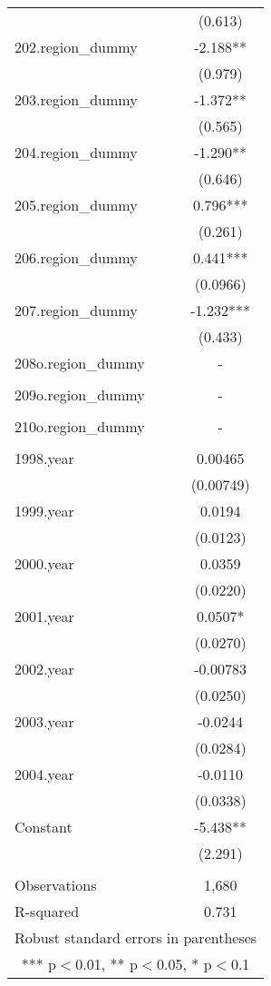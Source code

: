 \documentclass[]{article}
\begin{document}
\begin{tabular}{lc}
 & (0.613) \\
202.region\_dummy & -2.188** \\
 & (0.979) \\
203.region\_dummy & -1.372** \\
 & (0.565) \\
204.region\_dummy & -1.290** \\
 & (0.646) \\
205.region\_dummy & 0.796*** \\
 & (0.261) \\
206.region\_dummy & 0.441*** \\
 & (0.0966) \\
207.region\_dummy & -1.232*** \\
 & (0.433) \\
208o.region\_dummy & - \\
 &  \\
209o.region\_dummy & - \\
 &  \\
210o.region\_dummy & - \\
 &  \\
1998.year & 0.00465 \\
 & (0.00749) \\
1999.year & 0.0194 \\
 & (0.0123) \\
2000.year & 0.0359 \\
 & (0.0220) \\
2001.year & 0.0507* \\
 & (0.0270) \\
2002.year & -0.00783 \\
 & (0.0250) \\
2003.year & -0.0244 \\
 & (0.0284) \\
2004.year & -0.0110 \\
 & (0.0338) \\
Constant & -5.438** \\
 & (2.291) \\
 &  \\
Observations & 1,680 \\
 R-squared & 0.731 \\ \hline
\multicolumn{2}{c}{ Robust standard errors in parentheses} \\
\multicolumn{2}{c}{ *** p$<$0.01, ** p$<$0.05, * p$<$0.1} \\
\end{tabular}
\end{document}
